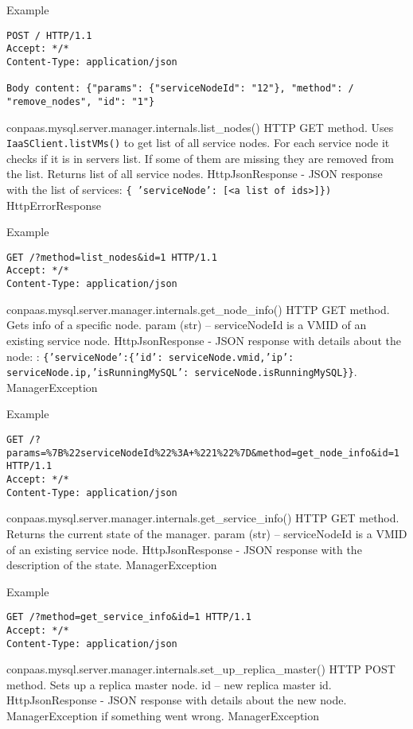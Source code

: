 \documentclass[a4paper,10pt]{article}
\begin{document}
Example
\begin{Verbatim}[frame=single]
POST / HTTP/1.1
Accept: */*
Content-Type: application/json

Body content: {"params": {"serviceNodeId": "12"}, "method": /
"remove_nodes", "id": "1"}
\end{Verbatim}

\noindent\conapi
{ conpaas.mysql.server.manager.internals.list\_nodes()}
{ HTTP GET method. Uses {\tt IaaSClient.listVMs()} to get list of all service nodes. For each service node it checks if it is in servers list. If some of them are missing they are removed from the list. Returns list of all service nodes.}
{}
{HttpJsonResponse - JSON response with the list of services: {\tt \{ 'serviceNode': [<a list of ids>]\})}}
{HttpErrorResponse}

Example
\begin{Verbatim}[frame=single]
GET /?method=list_nodes&id=1 HTTP/1.1
Accept: */*
Content-Type: application/json
\end{Verbatim}

\noindent\conapi
{ conpaas.mysql.server.manager.internals.get\_node\_info()}
{HTTP GET method. Gets info of a specific node.}
{param (str) -- serviceNodeId is a VMID of an existing service node.}
{HttpJsonResponse - JSON response with details about the node: : {\tt \{'serviceNode':\{'id': serviceNode.vmid,'ip': serviceNode.ip,'isRunningMySQL': serviceNode.isRunningMySQL\}\}}.}
{ManagerException}

Example
\begin{Verbatim}[frame=single]
GET /?params=%7B%22serviceNodeId%22%3A+%221%22%7D&method=get_node_info&id=1 HTTP/1.1
Accept: */*
Content-Type: application/json
\end{Verbatim}

\noindent\conapi
{ conpaas.mysql.server.manager.internals.get\_service\_info()}
{HTTP GET method. Returns the current state of the manager.}
{param (str) -- serviceNodeId is a VMID of an existing service node.}
{HttpJsonResponse - JSON response with the description of the state.}
{ManagerException}

Example
\begin{Verbatim}[frame=single]
GET /?method=get_service_info&id=1 HTTP/1.1
Accept: */*
Content-Type: application/json
\end{Verbatim}

\noindent\conapi
{ conpaas.mysql.server.manager.internals.set\_up\_replica\_master()}
{HTTP POST method. Sets up a replica master node.}
{ id -- new replica master id.}
{HttpJsonResponse - JSON response with details about the new
      node. ManagerException if something went wrong.}
{ManagerException}
     
\end{document}
